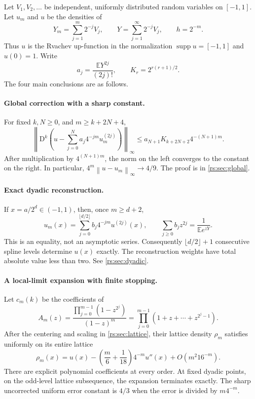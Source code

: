 \documentclass[11pt,a4paper,oneside,openany]{book}
\numberwithin{equation}{chapter}
\theoremstyle{definition}
\theoremstyle{remark}
\newcommand{\E}{\mathbb E}
\newcommand{\norm}[1]{\left\lVert #1\right\rVert}
\DeclareMathOperator{\supp}{supp}
\newcommand{\D}{\mathrm D}
\begin{document}
Let $V_1,V_2,\ldots$ be independent, uniformly distributed random variables
on $[-1,1]$. Let $u_m$ and $u$ be the densities of
\begin{equation}
 Y_m=\sum_{j=1}^m2^{-j}V_j,
 \qquad
 Y=\sum_{j=1}^{\infty}2^{-j}V_j,
 \qquad h=2^{-m}.
 \label{rs:eq:random-series}
\end{equation}
Thus $u$ is the Rvachev up-function in the normalization
$\supp u=[-1,1]$ and $u(0)=1$. Write
\begin{equation}
 a_j=\frac{\E Y^{2j}}{(2j)!},\qquad
 K_r=2^{r(r+1)/2}.
 \label{rs:eq:a-K}
\end{equation}
The four main conclusions are as follows.

\paragraph{Global correction with a sharp constant.}
For fixed $k,N\geq0$, and $m\geq k+2N+4$,
\begin{equation}
 \left\|\D^k\left(u-\sum_{j=0}^N a_j4^{-jm}u_m^{(2j)}\right)\right\|_\infty
 \leq a_{N+1}K_{k+2N+2}4^{-(N+1)m}.
 \label{rs:eq:intro-strong}
\end{equation}
After multiplication by $4^{(N+1)m}$, the norm on the left converges to
the constant on the right. In particular,
$4^m\norm{u-u_m}_\infty\to4/9$.
The proof is in \cref{rs:sec:global}.

\paragraph{Exact dyadic reconstruction.}
If $x=a/2^d\in(-1,1)$, then, once $m\geq d+2$,
\begin{equation}
 u_m(x)=\sum_{j=0}^{\lfloor d/2\rfloor}b_j4^{-jm}u^{(2j)}(x),
 \qquad \sum_{j\geq0}b_jz^{2j}=\frac1{\E e^{zY}}.
 \label{rs:eq:intro-dyadic}
\end{equation}
This is an equality, not an asymptotic series. Consequently
$\lfloor d/2\rfloor+1$ consecutive spline levels determine $u(x)$ exactly.
The reconstruction weights have total absolute value less than two.
See \cref{rs:sec:dyadic}.

\paragraph{A local-limit expansion with finite stopping.}
Let $c_m(k)$ be the coefficients of
\begin{equation}
 A_m(z)=\frac{\prod_{j=0}^{m-1}(1-z^{2^j})}{(1-z)^m}
       =\prod_{j=0}^{m-1}(1+z+\cdots+z^{2^j-1}).
 \label{rs:eq:intro-Am}
\end{equation}
After the centering and scaling in \cref{rs:sec:lattice}, their lattice
density $\rho_m$ satisfies uniformly on its entire lattice
\begin{equation}
 \rho_m(x)=u(x)-\left(\frac m6+\frac1{18}\right)4^{-m}u''(x)
            +O(m^2 16^{-m}).
 \label{rs:eq:intro-local}
\end{equation}
There are explicit polynomial coefficients at every order. At fixed
dyadic points, on the odd-level lattice subsequence, the expansion
terminates exactly. The sharp uncorrected uniform error constant is
$4/3$ when the error is divided by $m4^{-m}$.
\end{document}
